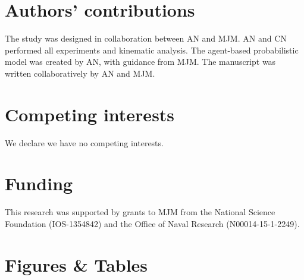 \documentclass[]{rsos}%
\begin{document}


\section*{Authors' contributions}

The study was designed in collaboration between AN and MJM.
AN and CN performed all experiments and kinematic analysis.
The agent-based probabilistic model was created by AN, with guidance from MJM. 
The manuscript was written collaboratively by AN and MJM.

\section*{Competing interests}

We declare we have no competing interests.

\section*{Funding}

This research was supported by grants to MJM from the National Science Foundation (IOS-1354842) and the Office of Naval Research (N00014-15-1-2249).





\linespread{1}\selectfont %



\pagebreak



\section*{Figures \& Tables}
\end{document}

